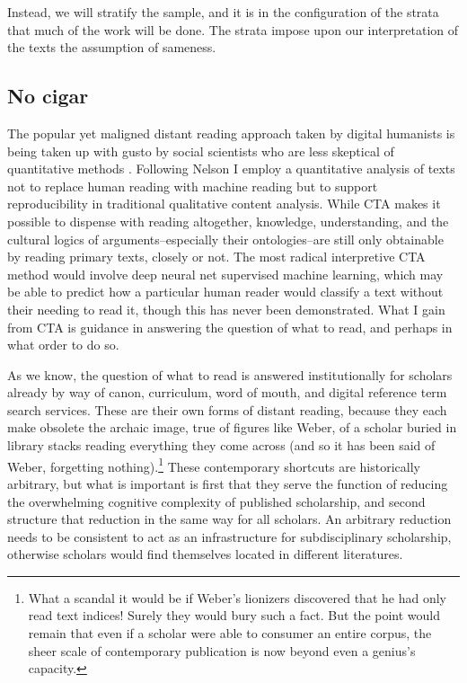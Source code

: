 \documentclass[]{book}
\let\rmarkdownfootnote\footnote%
\def\footnote{\protect\rmarkdownfootnote}
\theoremstyle{definition}
\theoremstyle{definition}
\theoremstyle{definition}
\theoremstyle{remark}
\begin{document}
Instead, we will stratify the sample, and it is in the configuration of
the strata that much of the work will be done. The strata impose upon
our interpretation of the texts the assumption of sameness.

\hypertarget{no-cigar}{%
\subsection{No cigar}\label{no-cigar}}

The popular yet maligned distant reading approach taken by digital
humanists \citep[e.g.~][]{Moretti2005Graphs} is being taken up with
gusto by social scientists who are less skeptical of quantitative
methods \citep[e.g.~][]{DiMaggio2013Exploiting}. Following Nelson
\citeyearpar{Nelson2017Computational} I employ a quantitative analysis
of texts not to replace human reading with machine reading but to
support reproducibility in traditional qualitative content analysis.
While CTA makes it possible to dispense with reading altogether,
knowledge, understanding, and the cultural logics of
arguments--especially their ontologies--are still only obtainable by
reading primary texts, closely or not. The most radical interpretive CTA
method would involve deep neural net supervised machine learning, which
may be able to predict how a particular human reader would classify a
text without their needing to read it, though this has never been
demonstrated. What I gain from CTA is guidance in answering the question
of what to read, and perhaps in what order to do so.

As we know, the question of what to read is answered institutionally for
scholars already by way of canon, curriculum, word of mouth, and digital
reference term search services. These are their own forms of distant
reading, because they each make obsolete the archaic image, true of
figures like Weber, of a scholar buried in library stacks reading
everything they come across (and so it has been said of Weber,
forgetting nothing).\footnote{What a scandal it would be if Weber's
  lionizers discovered that he had only read text indices! Surely they
  would bury such a fact. But the point would remain that even if a
  scholar were able to consumer an entire corpus, the sheer scale of
  contemporary publication is now beyond even a genius's capacity.}
These contemporary shortcuts are historically arbitrary, but what is
important is first that they serve the function of reducing the
overwhelming cognitive complexity of published scholarship, and second
structure that reduction in the same way for all scholars. An arbitrary
reduction needs to be consistent to act as an infrastructure for
subdisciplinary scholarship, otherwise scholars would find themselves
located in different literatures.
\end{document}
